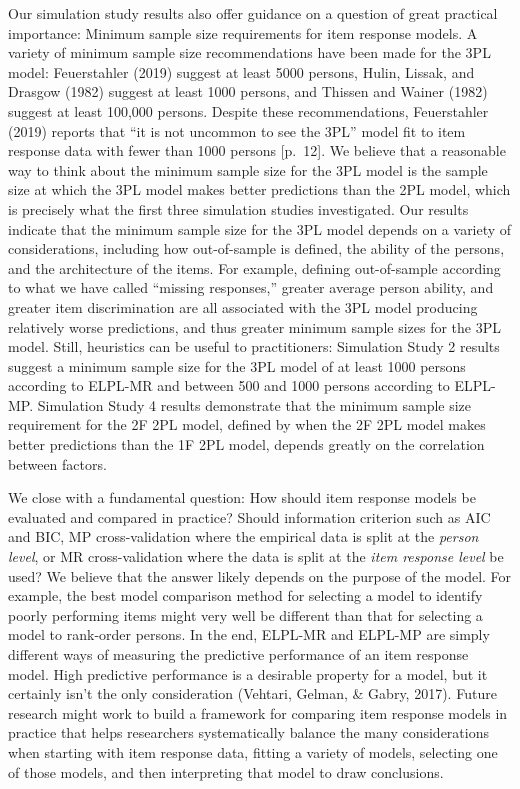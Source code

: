 \documentclass[
  english,
  man,floatsintext]{apa7}
\begin{document}
Our simulation study results also offer guidance on a question of great practical importance: Minimum sample size requirements for item response models. A variety of minimum sample size recommendations have been made for the 3PL model: Feuerstahler (2019) suggest at least 5000 persons, Hulin, Lissak, and Drasgow (1982) suggest at least 1000 persons, and Thissen and Wainer (1982) suggest at least 100,000 persons. Despite these recommendations, Feuerstahler (2019) reports that ``it is not uncommon to see the 3PL'' model fit to item response data with fewer than 1000 persons {[}p.~12{]}. We believe that a reasonable way to think about the minimum sample size for the 3PL model is the sample size at which the 3PL model makes better predictions than the 2PL model, which is precisely what the first three simulation studies investigated. Our results indicate that the minimum sample size for the 3PL model depends on a variety of considerations, including how out-of-sample is defined, the ability of the persons, and the architecture of the items. For example, defining out-of-sample according to what we have called ``missing responses,'' greater average person ability, and greater item discrimination are all associated with the 3PL model producing relatively worse predictions, and thus greater minimum sample sizes for the 3PL model. Still, heuristics can be useful to practitioners: Simulation Study 2 results suggest a minimum sample size for the 3PL model of at least 1000 persons according to ELPL-MR and between 500 and 1000 persons according to ELPL-MP. Simulation Study 4 results demonstrate that the minimum sample size requirement for the 2F 2PL model, defined by when the 2F 2PL model makes better predictions than the 1F 2PL model, depends greatly on the correlation between factors.

We close with a fundamental question: How should item response models be evaluated and compared in practice? Should information criterion such as AIC and BIC, MP cross-validation where the empirical data is split at the \emph{person level}, or MR cross-validation where the data is split at the \emph{item response level} be used? We believe that the answer likely depends on the purpose of the model. For example, the best model comparison method for selecting a model to identify poorly performing items might very well be different than that for selecting a model to rank-order persons. In the end, ELPL-MR and ELPL-MP are simply different ways of measuring the predictive performance of an item response model. High predictive performance is a desirable property for a model, but it certainly isn't the only consideration (Vehtari, Gelman, \& Gabry, 2017). Future research might work to build a framework for comparing item response models in practice that helps researchers systematically balance the many considerations when starting with item response data, fitting a variety of models, selecting one of those models, and then interpreting that model to draw conclusions.
\end{document}
